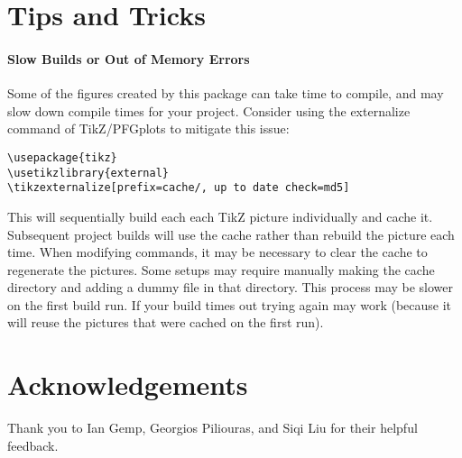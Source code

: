 \documentclass[10pt]{article}
\begin{document}
\section{Tips and Tricks}

\paragraph{Slow Builds or Out of Memory Errors}

Some of the figures created by this package can take time to compile, and may slow down compile times for your project. Consider using the externalize command of TikZ/PFGplots to mitigate this issue:

\begin{verbatim}
\usepackage{tikz}
\usetikzlibrary{external}
\tikzexternalize[prefix=cache/, up to date check=md5]
\end{verbatim}

This will sequentially build each each TikZ picture individually and cache it. Subsequent project builds will use the cache rather than rebuild the picture each time. When modifying commands, it may be necessary to clear the cache to regenerate the pictures. Some setups may require manually making the cache directory and adding a dummy file in that directory. This process may be slower on the first build run. If your build times out trying again may work (because it will reuse the pictures that were cached on the first run).

\section{Acknowledgements}

Thank you to Ian Gemp, Georgios Piliouras, and Siqi Liu for their helpful feedback.


\end{document}
